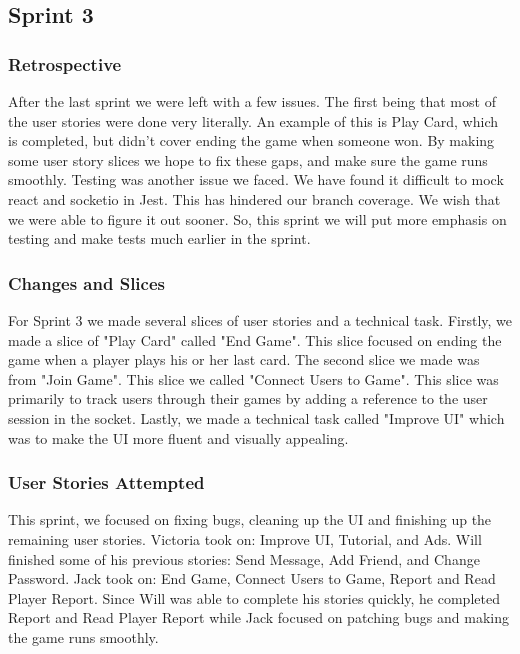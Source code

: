 \documentclass{article}
\begin{document}
\begin{tcolorbox}[colback=blue!10, colframe=blue, boxrule=0.5mm, sharp corners=south]
\subsection{Sprint 3}

\subsubsection{Retrospective}
After the last sprint we were left with a few issues. The first being that most of the user stories were done very literally. An example of this is Play Card, which is completed, but didn't cover ending the game when someone won. By making some user story slices we hope to fix these gaps, and make sure the game runs smoothly. Testing was another issue we faced. We have found it difficult to mock react and socketio in Jest. This has hindered our branch coverage. We wish that we were able to figure it out sooner. So, this sprint we will put more emphasis on testing and make tests much earlier in the sprint.

\subsubsection{Changes and Slices}
For Sprint 3 we made several slices of user stories and a technical task. Firstly, we made a slice of "Play Card" called "End Game". This slice focused on ending the game when a player plays his or her last card. The second slice we made was from "Join Game". This slice we called "Connect Users to Game". This slice was primarily to track users through their games by adding a reference to the user session in the socket. Lastly, we made a technical task called "Improve UI" which was to make the UI more fluent and visually appealing.

\subsubsection{User Stories Attempted}
This sprint, we focused on fixing bugs, cleaning up the UI and finishing up the remaining user stories. Victoria took on: Improve UI, Tutorial, and Ads. Will finished some of his previous stories: Send Message, Add Friend, and Change Password. Jack took on: End Game, Connect Users to Game, Report and Read Player Report. Since Will was able to complete his stories quickly, he completed Report and Read Player Report while Jack focused on patching bugs and making the game runs smoothly.
\end{tcolorbox}
\end{document}
